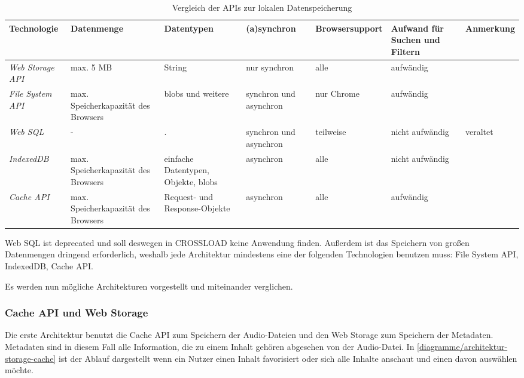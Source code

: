 \begin{sidewaystable}[h]
  \renewcommand{\arraystretch}{1.2}
  \centering
  \sffamily
  \begin{footnotesize}
    \begin{tabularx}{1.0\textwidth}{l L L L l l L}
      \toprule
      \textbf{Technologie} & \textbf{Datenmenge} & \textbf{Datentypen} & \textbf{(a)synchron} & \textbf{Browsersupport} & \textbf{Aufwand für Suchen und Filtern} & \textbf{Anmerkung} \\
      \midrule
      \emph{Web Storage \ac{API}} & max. 5 \ac{MB} & String & nur synchron & alle & aufwändig & \\
      \emph{File System \ac{API}} & max. Speicherkapazität des Browsers & \acp{blob} und weitere & synchron und asynchron & nur Chrome & aufwändig &  \\
      \emph{Web SQL} & - & . & synchron und asynchron & teilweise & nicht aufwändig & veraltet \\
      \emph{IndexedDB} & max. Speicherkapazität des Browsers & einfache Datentypen, Objekte, \acp{blob} & asynchron & alle & nicht aufwändig & \\
      \emph{Cache \ac{API}} & max. Speicherkapazität des Browsers & Request- und Response-Objekte & asynchron & alle & aufwändig & \\
      \bottomrule
    \end{tabularx}
  \end{footnotesize}
  \rmfamily
  \caption{Vergleich der APIs zur lokalen Datenspeicherung}
  \label{Kap4:Datenspeicherung}
\end{sidewaystable}

Web SQL ist deprecated und soll deswegen in CROSSLOAD keine Anwendung finden. Außerdem ist das Speichern von großen Datenmengen dringend erforderlich, weshalb jede Architektur mindestens eine der folgenden Technologien benutzen muss: File System \ac{API}, IndexedDB, Cache \ac{API}.

Es werden nun mögliche Architekturen vorgestellt und miteinander verglichen. 

\subsubsection{Cache API und Web Storage}
Die erste Architektur benutzt die Cache \ac{API} zum Speichern der Audio-Dateien und den Web Storage zum Speichern der Metadaten. Metadaten sind in diesem Fall alle Information, die zu einem Inhalt gehören abgesehen von der Audio-Datei. In \autoref{diagramme/architektur-storage-cache} ist der Ablauf dargestellt wenn ein Nutzer einen Inhalt favorisiert oder sich alle Inhalte anschaut und einen davon auswählen möchte. 

